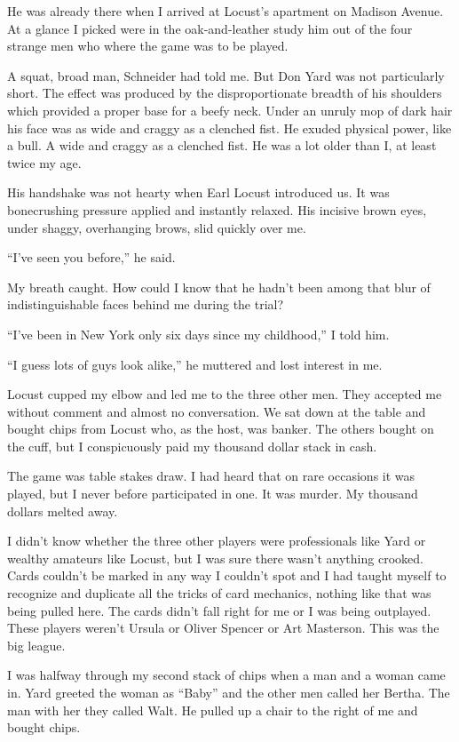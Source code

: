 \documentclass{novel}
\begin{document}
\scenestars

He was already there when I arrived at Locust’s apartment on Madison Avenue. At a glance I picked were in the oak-and-leather study him out of the four strange men who where the game was to be played.

A squat, broad man, Schneider had told me. But Don Yard was not particularly short. The effect was produced by the disproportionate breadth of his shoulders which provided a proper base for a beefy neck. Under an unruly mop of dark hair his face was as wide and craggy as a clenched fist. He exuded physical power, like a bull. A wide and craggy as a clenched fist. He was a lot older than I, at least twice my age.

His handshake was not hearty when Earl Locust introduced us. It was bonecrushing pressure applied and instantly relaxed. His incisive brown eyes, under shaggy, overhanging brows, slid quickly over me.

“I’ve seen you before,” he said.

My breath caught. How could I know that he hadn’t been among that blur of indistinguishable faces behind me during the trial?

“I’ve been in New York only six days since my childhood,” I told him.

“I guess lots of guys look alike,” he muttered and lost interest in me.

Locust cupped my elbow and led me to the three other men. They accepted me without comment and almost no conversation. We sat down at the table and bought chips from Locust who, as the host, was banker. The others bought on the cuff, but I conspicuously paid my thousand dollar stack in cash.

The game was table stakes draw. I had heard that on rare occasions it was played, but I never before participated in one. It was murder. My thousand dollars melted away.

I didn’t know whether the three other players were professionals like Yard or wealthy amateurs like Locust, but I was sure there wasn’t anything crooked. Cards couldn’t be marked in any way I couldn’t spot and I had taught myself to recognize and duplicate all the tricks of card mechanics, nothing like that was being pulled here. The cards didn’t fall right for me or I was being outplayed. These players weren’t Ursula or Oliver Spencer or Art Masterson. This was the big league.

I was halfway through my second stack of chips when a man and a woman came in. Yard greeted the woman as “Baby” and the other men called her Bertha. The man with her they called Walt. He pulled up a chair to the right of me and bought chips.
\end{document}
